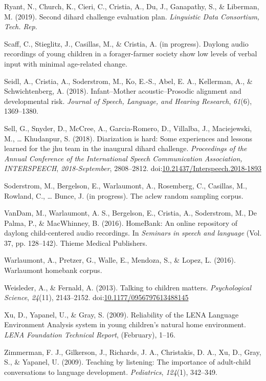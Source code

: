 \documentclass[english,floatsintext,man]{apa6}
\begin{document}
\hypertarget{ref-ryant2019second}{}
Ryant, N., Church, K., Cieri, C., Cristia, A., Du, J., Ganapathy, S., \&
Liberman, M. (2019). Second dihard challenge evaluation plan.
\emph{Linguistic Data Consortium, Tech. Rep}.

\hypertarget{ref-scaff}{}
Scaff, C., Stieglitz, J., Casillas, M., \& Cristia, A. (in progress).
Daylong audio recordings of young children in a forager-farmer society
show low levels of verbal input with minimal age-related change.

\hypertarget{ref-Seidl2018}{}
Seidl, A., Cristia, A., Soderstrom, M., Ko, E.-S., Abel, E. A.,
Kellerman, A., \& Schwichtenberg, A. (2018). Infant--Mother
acoustic--Prosodic alignment and developmental risk. \emph{Journal of
Speech, Language, and Hearing Research}, \emph{61}(6), 1369--1380.

\hypertarget{ref-sell2018}{}
Sell, G., Snyder, D., McCree, A., Garcia-Romero, D., Villalba, J.,
Maciejewski, M., \ldots{} Khudanpur, S. (2018). Diarization is hard:
Some experiences and lessons learned for the jhu team in the inaugural
dihard challenge. \emph{Proceedings of the Annual Conference of the
International Speech Communication Association, INTERSPEECH},
\emph{2018-September}, 2808--2812.
doi:\href{https://doi.org/10.21437/Interspeech.2018-1893}{10.21437/Interspeech.2018-1893}

\hypertarget{ref-soderstrom}{}
Soderstrom, M., Bergelson, E., Warlaumont, A., Rosemberg, C., Casillas,
M., Rowland, C., \ldots{} Bunce, J. (in progress). The aclew random
sampling corpus.

\hypertarget{ref-vandam2016homebank}{}
VanDam, M., Warlaumont, A. S., Bergelson, E., Cristia, A., Soderstrom,
M., De Palma, P., \& MacWhinney, B. (2016). HomeBank: An online
repository of daylong child-centered audio recordings. In \emph{Seminars
in speech and language} (Vol. 37, pp. 128--142). Thieme Medical
Publishers.

\hypertarget{ref-warlaumont2016warlaumont}{}
Warlaumont, A., Pretzer, G., Walle, E., Mendoza, S., \& Lopez, L.
(2016). Warlaumont homebank corpus.

\hypertarget{ref-Weisleder2013a}{}
Weisleder, A., \& Fernald, A. (2013). Talking to children matters.
\emph{Psychological Science}, \emph{24}(11), 2143--2152.
doi:\href{https://doi.org/10.1177/0956797613488145}{10.1177/0956797613488145}

\hypertarget{ref-Xu2009}{}
Xu, D., Yapanel, U., \& Gray, S. (2009). Reliability of the LENA
Language Environment Analysis system in young children's natural home
environment. \emph{LENA Foundation Technical Report}, (February), 1--16.

\hypertarget{ref-zimmerman2009}{}
Zimmerman, F. J., Gilkerson, J., Richards, J. A., Christakis, D. A., Xu,
D., Gray, S., \& Yapanel, U. (2009). Teaching by listening: The
importance of adult-child conversations to language development.
\emph{Pediatrics}, \emph{124}(1), 342--349.
\end{document}
